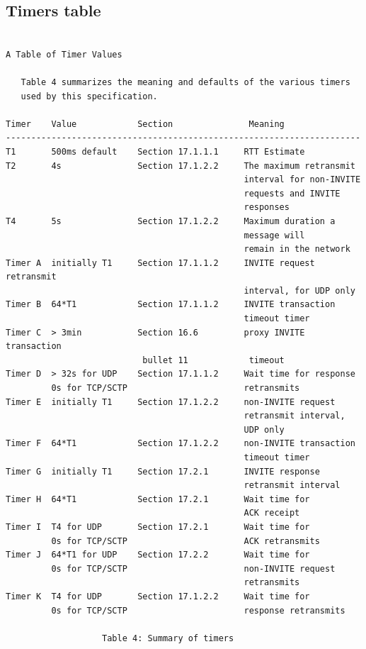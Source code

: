 \documentclass[a4paper]{report}
\begin{document}
\subsection{Timers table}

\begin{verbatim}

A Table of Timer Values

   Table 4 summarizes the meaning and defaults of the various timers
   used by this specification.

Timer    Value            Section               Meaning
----------------------------------------------------------------------
T1       500ms default    Section 17.1.1.1     RTT Estimate
T2       4s               Section 17.1.2.2     The maximum retransmit
                                               interval for non-INVITE
                                               requests and INVITE
                                               responses
T4       5s               Section 17.1.2.2     Maximum duration a
                                               message will
                                               remain in the network
Timer A  initially T1     Section 17.1.1.2     INVITE request retransmit
                                               interval, for UDP only
Timer B  64*T1            Section 17.1.1.2     INVITE transaction
                                               timeout timer
Timer C  > 3min           Section 16.6         proxy INVITE transaction
                           bullet 11            timeout
Timer D  > 32s for UDP    Section 17.1.1.2     Wait time for response
         0s for TCP/SCTP                       retransmits
Timer E  initially T1     Section 17.1.2.2     non-INVITE request
                                               retransmit interval,
                                               UDP only
Timer F  64*T1            Section 17.1.2.2     non-INVITE transaction
                                               timeout timer
Timer G  initially T1     Section 17.2.1       INVITE response
                                               retransmit interval
Timer H  64*T1            Section 17.2.1       Wait time for
                                               ACK receipt
Timer I  T4 for UDP       Section 17.2.1       Wait time for
         0s for TCP/SCTP                       ACK retransmits
Timer J  64*T1 for UDP    Section 17.2.2       Wait time for
         0s for TCP/SCTP                       non-INVITE request
                                               retransmits
Timer K  T4 for UDP       Section 17.1.2.2     Wait time for
         0s for TCP/SCTP                       response retransmits

                   Table 4: Summary of timers

\end{verbatim}
\end{document}
